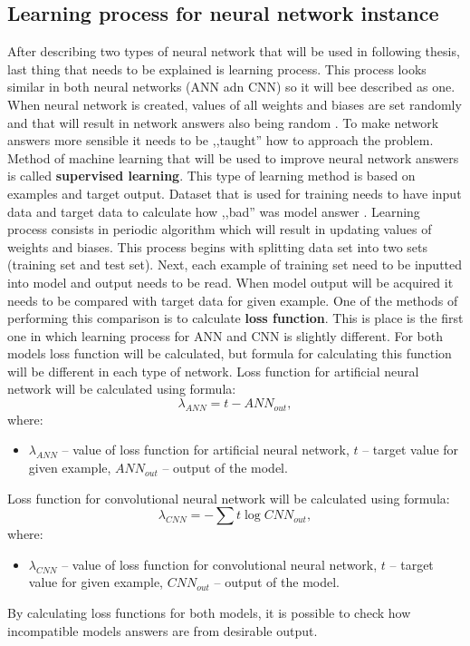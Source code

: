     \subsection{Learning process for neural network instance}\label{sec:learning-process-for-nn-instance}
    After describing two types of neural network that will be used in following thesis, last thing that needs to be explained is learning process. This process looks similar in both neural networks (ANN adn CNN) so it will bee described as one. When neural network is created, values of all weights and biases are set randomly and that will result in network answers also being random \cite{bib:article-how-neural-network-learn}. To make network answers more sensible it needs to be ,,taught'' how to approach the problem. Method of machine learning that will be used to improve neural network answers is called \textbf{supervised learning}. This type of learning method is based on examples and target output. Dataset that is used for training needs to have input data and target data to calculate how ,,bad'' was model answer \cite{bib:book-statistical-learning}. Learning process consists in periodic algorithm which will result in updating values of weights and biases. This process begins with splitting data set into two sets (training set and test set). Next, each example of training set need to be inputted into model and output needs to be read. When model output will be acquired it needs to be compared with target data for given example. One of the methods of performing this comparison is to calculate \textbf{loss function}. This is place is the first one in which learning process for ANN and CNN is slightly different. For both models loss function will be calculated, but formula for calculating this function will be different in each type of network. Loss function for artificial neural network will be calculated using formula:
    \begin{equation}
        \lambda_{ANN} = t - ANN_{out},
    \end{equation}
    where:
    \begin{itemize}[label=]
        \item $\lambda_{ANN}$ -- value of loss function for artificial neural network, $t$ -- target value for given example, $ANN_{out}$ -- output of the model.
    \end{itemize}
    Loss function for convolutional neural network will be calculated using formula:
    \begin{equation}
        \lambda_{CNN} = -\sum t \log CNN_{out},
    \end{equation}
    where:
    \begin{itemize}[label=]
        \item $\lambda_{CNN}$ -- value of loss function for convolutional neural network, $t$ -- target value for given example, $CNN_{out}$ -- output of the model.
    \end{itemize}
    By calculating loss functions for both models, it is possible to check how incompatible models answers are from desirable output. 

